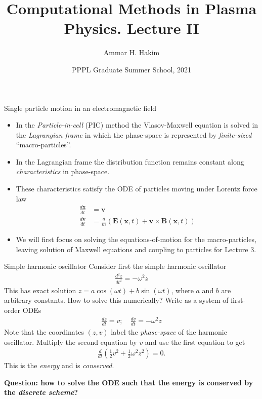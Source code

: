\documentclass[pdf]{beamer}
\title[{\tt }] {Computational Methods in Plasma Physics. Lecture II}%
\author[http://cmpp.rtfd.io]%
{Ammar H. Hakim\inst{1}}%
\institute[PPPL]
{ \inst{1} Princeton Plasma Physics Laboratory, Princeton, NJ %
}
\date[8/17/2021]{PPPL Graduate Summer School, 2021}
\newcommand{\mvec}[1]{\mathbf{#1}}
\theoremstyle{definition}
\begin{document}
\begin{frame}
  \titlepage
\end{frame}

\begin{frame}{Single particle motion in an electromagnetic field}
  \small%
  \begin{itemize}
  \item In the \emph{Particle-in-cell} (PIC) method the Vlasov-Maxwell
    equation is solved in the \emph{Lagrangian frame} in which the
    phase-space is represented by \emph{finite-sized}
    ``macro-particles''.
  \item In the Lagrangian frame the distribution
    function remains constant along \emph{characteristics} in
    phase-space.
  \item These characteristics satisfy the ODE of particles moving
    under Lorentz force law
    \begin{align*}
      \frac{d\mvec{x}}{dt} &= \mvec{v} \\
      \frac{d\mvec{v}}{dt} &= \frac{q}{m}(\mvec{E}(\mvec{x},t) + \mvec{v}\times\mvec{B}(\mvec{x},t))
    \end{align*}
  \item We will first focus on solving the equations-of-motion for
    the macro-particles, leaving solution of Maxwell equations and
    coupling to particles for Lecture 3.
  \end{itemize}
\end{frame}

\begin{frame}{Simple harmonic oscillator}
  \small%
  Consider first the simple harmonic oscillator
  \begin{align*}
    \frac{d^2z}{dt^2} = -\omega^2 z
  \end{align*}
  This has exact solution $z = a\cos(\omega t) + b\sin(\omega t)$,
  where $a$ and $b$ are arbitrary constants. How to solve this
  numerically? Write as a system of first-order ODEs
  \begin{align*}
    \frac{dz}{dt} = v; \quad \frac{dv}{dt} = -\omega^2 z
  \end{align*}
  Note that the coordinates $(z,v)$ label the \emph{phase-space} of
  the harmonic oscillator. Multiply the second equation by $v$ and use
  the first equation to get
  \begin{align*}
    \frac{d}{dt}\left(\frac{1}{2} v^2 + \frac{1}{2}\omega^2 z^2\right) = 0.
  \end{align*}
  This is the \emph{energy} and is \emph{conserved}.%
  
  \bf{Question: how to solve the ODE such that the energy is conserved
    by the \emph{discrete scheme}?}
\end{frame}
\end{document}
